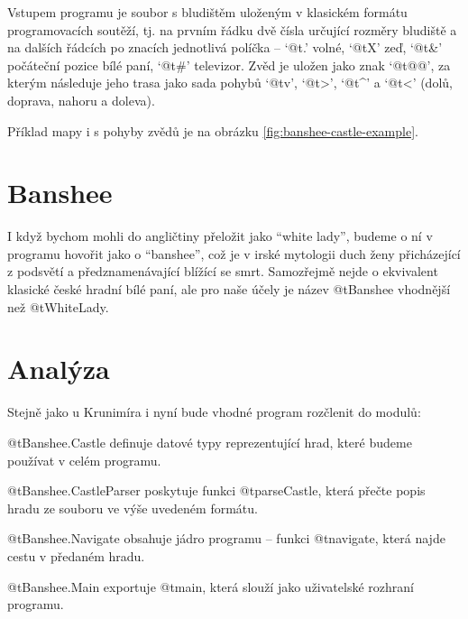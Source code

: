 Vstupem programu je soubor s bludištěm uloženým v klasickém formátu
programovacích soutěží, tj. na prvním řádku dvě čísla určující rozměry bludiště
a na dalších řádcích po znacích jednotlivá políčka -- `@t{.}' volné, `@t{X}'
zeď, `@t{\&}' počáteční pozice bílé paní, `@t{\#}' televizor. Zvěd je uložen
jako znak `@t{@@}', za kterým následuje jeho trasa jako sada pohybů `@t{v}',
`@t{>}', `@t{\^}' a `@t{<}' (dolů, doprava, nahoru a doleva). 

Příklad mapy i s pohyby zvědů je na obrázku \ref{fig:banshee-castle-example}.



\section{Banshee}

I když bychom mohli do angličtiny přeložit  jako ``white lady'',
budeme o ní v programu hovořit jako o ``banshee'', což je v irské mytologii duch
ženy přicházející z podsvětí a předznamenávající blížící se smrt. Samozřejmě
nejde o ekvivalent klasické české hradní bílé paní, ale pro naše účely je název
@t{Banshee} vhodnější než @t{WhiteLady}.

\section{Analýza}

Stejně jako u Krunimíra i nyní bude vhodné program rozčlenit do modulů:

\begin{description}

  \item @t{Banshee.Castle} definuje datové typy reprezentující hrad, které
    budeme používat v celém programu.

  \item @t{Banshee.CastleParser} poskytuje funkci @t{parseCastle}, která přečte
    popis hradu ze souboru ve výše uvedeném formátu.

  \item @t{Banshee.Navigate} obsahuje jádro programu -- funkci @t{navigate},
    která najde cestu v předaném hradu.

  \item @t{Banshee.Main} exportuje @t{main}, která slouží jako uživatelské
    rozhraní programu.

\end{description}






